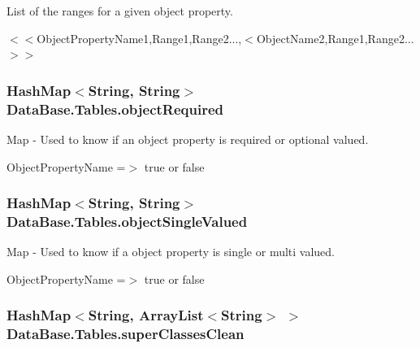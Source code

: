 List of the ranges for a given object property. 

$<$$<$ObjectPropertyName1,Range1,Range2...,$<$ObjectName2,Range1,Range2...$>$$>$ \hypertarget{class_data_base_1_1_tables_a11874c966b0f22fc88b7fb46cb3331ed}{
\subsubsection[{objectRequired}]{\setlength{\rightskip}{0pt plus 5cm}HashMap$<$String, String$>$ {\bf DataBase.Tables.objectRequired}}}
\label{class_data_base_1_1_tables_a11874c966b0f22fc88b7fb46cb3331ed}


Map -\/ Used to know if an object property is required or optional valued. 

ObjectPropertyName =$>$ true or false \hypertarget{class_data_base_1_1_tables_ae379376430f85d3c7cef16bf1a962ff1}{
\subsubsection[{objectSingleValued}]{\setlength{\rightskip}{0pt plus 5cm}HashMap$<$String, String$>$ {\bf DataBase.Tables.objectSingleValued}}}
\label{class_data_base_1_1_tables_ae379376430f85d3c7cef16bf1a962ff1}


Map -\/ Used to know if a object property is single or multi valued. 

ObjectPropertyName =$>$ true or false \hypertarget{class_data_base_1_1_tables_a5ec0af78ac892df612bf3ea7a91e37c5}{
\subsubsection[{superClassesClean}]{\setlength{\rightskip}{0pt plus 5cm}HashMap$<$String, ArrayList$<$String$>$ $>$ {\bf DataBase.Tables.superClassesClean}}}
\label{class_data_base_1_1_tables_a5ec0af78ac892df612bf3ea7a91e37c5}


